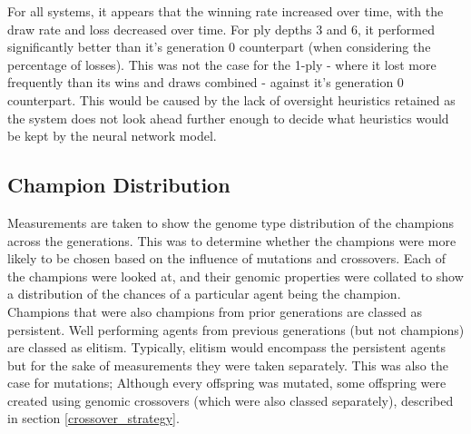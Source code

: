 \documentclass[12pt,a4paper]{article}
\begin{document}
    For all systems, it appears that the winning rate increased over time, with the draw rate and loss decreased over time. For ply depths 3 and 6, it performed significantly better than it's generation 0 counterpart (when considering the percentage of losses). This was not the case for the 1-ply - where it lost more frequently than its wins and draws combined - against it's generation 0 counterpart. This would be caused by the lack of oversight heuristics retained as the system does not look ahead further enough to decide what heuristics would be kept by the neural network model.

    \subsection{Champion Distribution}
        Measurements are taken to show the genome type distribution of the champions across the generations.
        This was to determine whether the champions were more likely to be chosen based on the influence of mutations and crossovers. Each of the champions were looked at, and their genomic properties were collated to show a distribution of the chances of a particular agent being the champion. Champions that were also champions from prior generations are classed as persistent. Well performing agents from previous generations (but not champions) are classed as elitism. Typically, elitism would encompass the persistent agents but for the sake of measurements they were taken separately. This was also the case for mutations; Although every offspring was mutated, some offspring were created using genomic crossovers (which were also classed separately), described in section \ref{crossover_strategy}.  
\end{document}
